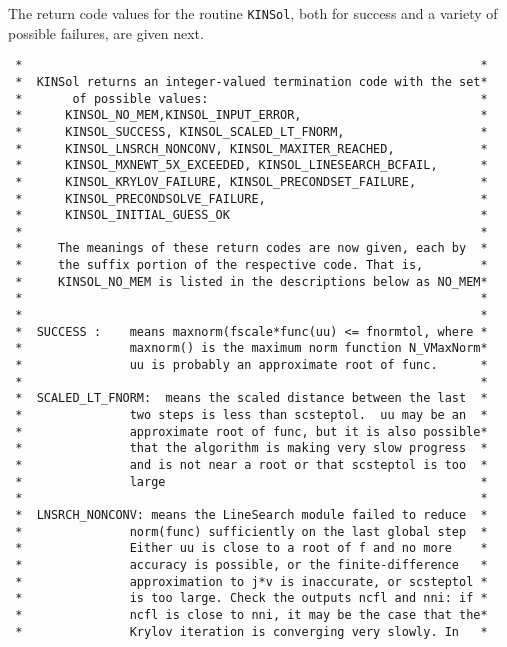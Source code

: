 The return code values for the routine {\tt KINSol}, both for success and a
variety of possible failures, are given next.

\small
\begin{verbatim}
 *                                                                *
 *  KINSol returns an integer-valued termination code with the set*
 *       of possible values:                                      *
 *      KINSOL_NO_MEM,KINSOL_INPUT_ERROR,                         *
 *      KINSOL_SUCCESS, KINSOL_SCALED_LT_FNORM,                   * 
 *      KINSOL_LNSRCH_NONCONV, KINSOL_MAXITER_REACHED,            *
 *      KINSOL_MXNEWT_5X_EXCEEDED, KINSOL_LINESEARCH_BCFAIL,      *
 *      KINSOL_KRYLOV_FAILURE, KINSOL_PRECONDSET_FAILURE,         *
 *      KINSOL_PRECONDSOLVE_FAILURE,                              *
 *      KINSOL_INITIAL_GUESS_OK                                   *
 *                                                                *
 *     The meanings of these return codes are now given, each by  *
 *     the suffix portion of the respective code. That is,        *
 *     KINSOL_NO_MEM is listed in the descriptions below as NO_MEM*
 *                                                                *
 *                                                                *
 *  SUCCESS :    means maxnorm(fscale*func(uu) <= fnormtol, where *
 *               maxnorm() is the maximum norm function N_VMaxNorm*
 *               uu is probably an approximate root of func.      *
 *                                                                *
 *  SCALED_LT_FNORM:  means the scaled distance between the last  *
 *               two steps is less than scsteptol.  uu may be an  *
 *               approximate root of func, but it is also possible*
 *               that the algorithm is making very slow progress  *
 *               and is not near a root or that scsteptol is too  *
 *               large                                            *
 *                                                                *
 *  LNSRCH_NONCONV: means the LineSearch module failed to reduce  *
 *               norm(func) sufficiently on the last global step  *
 *               Either uu is close to a root of f and no more    *
 *               accuracy is possible, or the finite-difference   *
 *               approximation to j*v is inaccurate, or scsteptol *
 *               is too large. Check the outputs ncfl and nni: if *
 *               ncfl is close to nni, it may be the case that the*
 *               Krylov iteration is converging very slowly. In   *

\end{verbatim}
